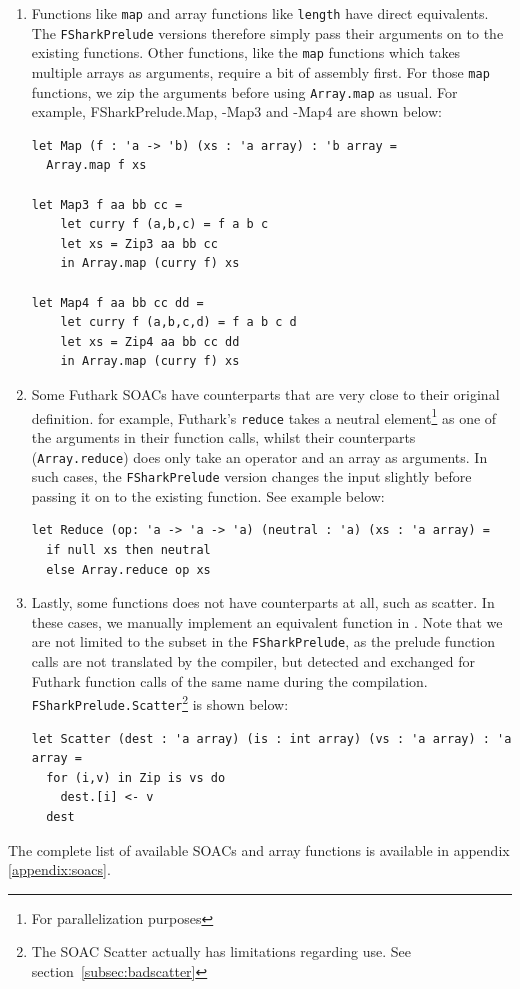 \begin{enumerate}
  \item Functions like \texttt{map} and array functions like
    \texttt{length} have direct \fsharp{} equivalents. The
    \texttt{FSharkPrelude} versions therefore simply pass their arguments on to
    the existing functions.
    Other functions, like the \texttt{map} functions which takes multiple arrays as
    arguments, require a bit of assembly first. For those \texttt{map} functions,
    we zip the arguments before using \texttt{Array.map} as usual.
    For example, FSharkPrelude.Map, -Map3 and -Map4 are shown below:
\begin{verbatim}
let Map (f : 'a -> 'b) (xs : 'a array) : 'b array =
  Array.map f xs

let Map3 f aa bb cc =
    let curry f (a,b,c) = f a b c
    let xs = Zip3 aa bb cc
    in Array.map (curry f) xs

let Map4 f aa bb cc dd =
    let curry f (a,b,c,d) = f a b c d
    let xs = Zip4 aa bb cc dd
    in Array.map (curry f) xs
\end{verbatim}

  \item Some Futhark SOACs have \fsharp{} counterparts that are very close to
    their original definition.
    for example, Futhark's \texttt{reduce} takes a neutral element\footnote{For
      parallelization purposes} as one of the
    arguments in their function calls, whilst their \fsharp{} counterparts
    (\texttt{Array.reduce}) does only take an operator and an array as
    arguments.
    In such cases, the \texttt{FSharkPrelude} version changes the input slightly
    before passing it on to the existing function. See example below:

\begin{verbatim}
let Reduce (op: 'a -> 'a -> 'a) (neutral : 'a) (xs : 'a array) =
  if null xs then neutral 
  else Array.reduce op xs
\end{verbatim}

  \item Lastly, some functions does not have \fsharp{} counterparts at all, such
    as scatter. In these cases, we manually implement an equivalent function in
    \fsharp{}.
    Note that we are not limited to the \fshark{} subset in the
    \texttt{FSharkPrelude}, as the prelude function calls are not translated by the
    \fshark{} compiler, but detected and exchanged for
    Futhark function calls of the same name during the \fshark{} compilation.
    \texttt{FSharkPrelude.Scatter}\footnote{The SOAC Scatter actually has limitations
      regarding \fshark{} use. See section~\ref{subsec:badscatter}} is shown below:
\begin{verbatim}
let Scatter (dest : 'a array) (is : int array) (vs : 'a array) : 'a array =
  for (i,v) in Zip is vs do
    dest.[i] <- v
  dest
\end{verbatim}

\end{enumerate}
The complete list of available SOACs and array functions is available in
appendix \ref{appendix:soacs}.

